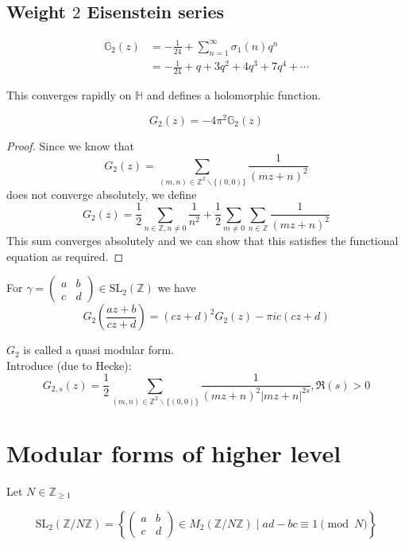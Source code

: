\documentclass[oneside, 12pt]{scrbook}
\newcommand{\ZZ}{\mathbb Z}
\theoremstyle{theorem}
\begin{document}
\subsection{Weight $2$ Eisenstein series}

\begin{definition}
\begin{align*}
\mathbb{G}_{2}(z) &= -\frac{1}{24} + \sum_{n=1}^{\infty} \sigma_{1}(n)q^n \\
&= -\frac{1}{24} + q + 3q^2 + 4q^3 + 7q^4 + \cdots 
\end{align*} 
\end{definition}

This converges rapidly on $\mathbb{H}$ and defines a holomorphic function. 

\begin{proposition}
$$G_{2}(z) = - 4 \pi^2 \mathbb{G}_{2}(z)$$
\end{proposition}

\begin{proof}
Since we know that $$G_{2}(z) = \sum_{(m,n) \in \ZZ^2 \backslash \{(0,0)\}}\frac{1}{(mz+n)^2}$$ does not converge absolutely, we define $$G_{2}(z) = \frac{1}{2} \sum_{n \in \ZZ , n \neq 0} \frac{1}{n^2} + \frac{1}{2} \sum_{m \neq 0} \sum_{n \in \ZZ} \frac{1}{(mz+n)^2}$$
This sum converges absolutely and we can show that this satisfies the functional equation as required.
\end{proof}

\begin{proposition}
For $\gamma = \begin{pmatrix}
a & b \\ c & d 
\end{pmatrix} \in \mathrm{SL}_{2}(\ZZ)$ we have $$G_{2}\left( \frac{az+b}{cz+d} \right) = (cz+d)^2 G_{2}(z) - \pi i c(cz+d)$$
\end{proposition}

$G_{2}$ is called a quasi modular form. \\

Introduce (due to Hecke): $$G_{2,s}(z) = \frac{1}{2} \sum_{(m,n)\in \ZZ^2 \backslash \{(0,0)\}} \frac{1}{(mz+n)^2 |mz+n|^{2s}} , \mathfrak{R}(s) >0$$

\section{Modular forms of higher level}

Let $N \in \ZZ_{\geq 1}$ 

$$\mathrm{SL}_{2}(\ZZ / N \ZZ) =\left\{ \begin{pmatrix}
a & b \\ c & d
\end{pmatrix} \in M_{2}(\ZZ / N \ZZ) \mid ad-bc \equiv 1 \pmod{N} \right\}$$
\end{document}
